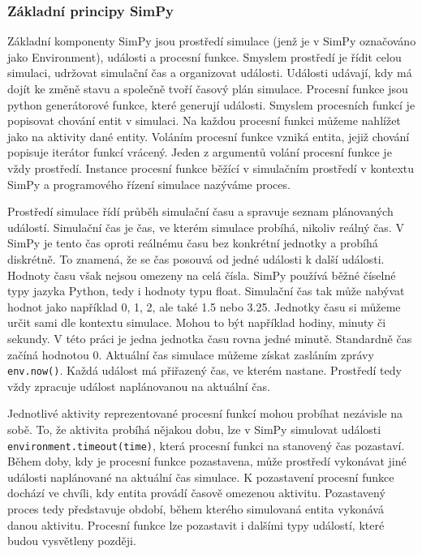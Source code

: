 \documentclass[
  program=itp,
  biblatex,
  figures=false,
  glossaries,
  index
]{kidiplom}
\begin{document}
\subsubsection{Základní principy SimPy}
Základní komponenty SimPy jsou prostředí simulace (jenž je v SimPy označováno jako Environment), události a procesní funkce. Smyslem prostředí je řídit celou simulaci, udržovat simulační čas a organizovat události. Události udávají, kdy má dojít ke změně stavu a společně tvoří časový plán simulace. Procesní funkce jsou python generátorové funkce, které generují události. Smyslem procesních funkcí je popisovat chování entit v simulaci. Na každou procesní funkci můžeme nahlížet jako na aktivity dané entity. Voláním procesní funkce vzniká entita, jejiž chování popisuje iterátor funkcí vrácený. Jeden z argumentů volání procesní funkce je vždy prostředí. Instance procesní funkce běžící v simulačním prostředí v kontextu SimPy a programového řízení simulace nazýváme proces.

Prostředí simulace řídí průběh simulační času a spravuje seznam plánovaných událostí. Simulační čas je čas, ve kterém simulace probíhá, nikoliv reálný čas. V SimPy je tento čas oproti reálnému času bez konkrétní jednotky a probíhá diskrétně. To znamená, že se čas posouvá od jedné události k další události. Hodnoty času však nejsou omezeny na celá čísla. SimPy používá běžné číselné typy jazyka Python, tedy i hodnoty typu float. Simulační čas tak může nabývat hodnot jako například 0, 1, 2, ale také 1.5 nebo 3.25. Jednotky času si můžeme určit sami dle kontextu simulace. Mohou to být například hodiny, minuty či sekundy. V této práci je jedna jednotka času rovna jedné minutě. Standardně čas začíná hodnotou 0. Aktuální čas simulace můžeme získat zasláním zprávy \texttt{env.now()}. Každá událost má přiřazený čas, ve kterém nastane. Prostředí tedy vždy zpracuje událost naplánovanou na aktuální čas.

Jednotlivé aktivity reprezentované procesní funkcí mohou probíhat nezávisle na sobě. To, že aktivita probíhá nějakou dobu, lze v SimPy simulovat události \texttt{environment.timeout(time)}, která procesní funkci na stanovený čas pozastaví. Během doby, kdy je procesní funkce pozastavena, může prostředí vykonávat jiné události naplánované na aktuální čas simulace. K pozastavení procesní funkce dochází ve chvíli, kdy entita provádí časově omezenou aktivitu. Pozastavený proces tedy představuje období, během kterého simulovaná entita vykonává danou aktivitu. Procesní funkce lze pozastavit i dalšími typy událostí, které budou vysvětleny později.
\end{document}
